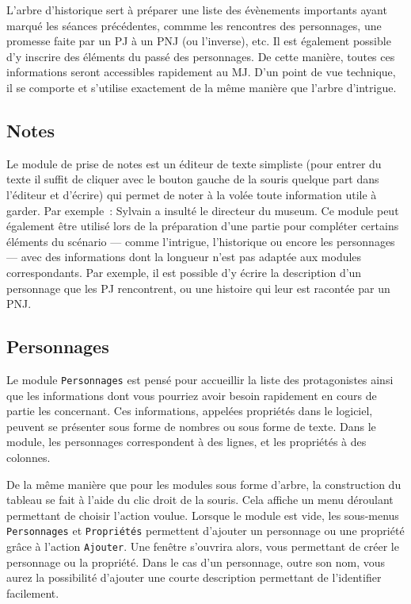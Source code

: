 \documentclass[a4paper,12pt]{article}
\newcommand*{\interfaceitem}[1]{\texttt{#1}}
\newcommand*{\guillemets}[1]{\og #1\fg{}\xspace}
\begin{document}
L'arbre d'historique sert à préparer une liste des évènements importants ayant marqué les séances précédentes, commme les rencontres des personnages, une promesse faite par un PJ à un PNJ (ou l'inverse), etc.
Il est également possible d'y inscrire des éléments du passé des personnages.
De cette manière, toutes ces informations seront accessibles rapidement au MJ.
D'un point de vue technique, il se comporte et s'utilise exactement de la même manière que l'arbre d'intrigue.

\subsection{Notes}
\label{sec:notes}

Le module de prise de notes est un éditeur de texte simpliste (pour entrer du texte il suffit de cliquer avec le bouton gauche de la souris quelque part dans l'éditeur et d'écrire) qui permet de noter à la volée toute information utile à garder.
Par exemple~: \guillemets{Sylvain a insulté le directeur du museum}.
Ce module peut également être utilisé lors de la préparation d'une partie pour compléter certains éléments du scénario --- comme l'intrigue, l'historique ou encore les personnages --- avec des informations dont la longueur n'est pas adaptée aux modules correspondants.
Par exemple, il est possible d'y écrire la description d'un personnage que les PJ rencontrent, ou une histoire qui leur est racontée par un PNJ.

\subsection{Personnages}
\label{sec:perso}

Le module \interfaceitem{Personnages} est pensé pour accueillir la liste des protagonistes ainsi que les informations dont vous pourriez avoir besoin rapidement en cours de partie les concernant.
Ces informations, appelées \guillemets{propriétés} dans le logiciel, peuvent se présenter sous forme de nombres ou sous forme de texte.
Dans le module, les personnages correspondent à des lignes, et les propriétés à des colonnes.

De la même manière que pour les modules sous forme d'arbre, la construction du tableau se fait à l'aide du clic droit de la souris.
Cela affiche un menu déroulant permettant de choisir l'action voulue.
Lorsque le module est vide, les sous-menus \interfaceitem{Personnages} et \interfaceitem{Propriétés} permettent d'ajouter un personnage ou une propriété grâce à l'action \interfaceitem{Ajouter}.
Une fenêtre s'ouvrira alors, vous permettant de créer le personnage ou la propriété.
Dans le cas d'un personnage, outre son nom, vous aurez la possibilité d'ajouter une courte description permettant de l'identifier facilement.
\end{document}
